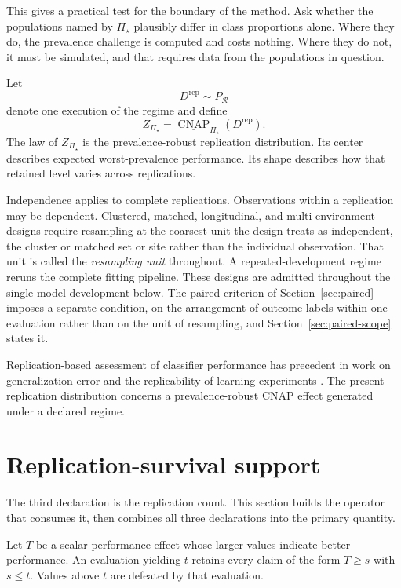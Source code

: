 \documentclass[11pt]{article}
\newcommand{\CNAP}{\operatorname{CNAP}}
\newcommand{\Regime}{\mathcal{R}}
\newcommand{\PSet}{\Pi_\star}
\newcommand{\RobCNAP}{\underline{\CNAP}_{\PSet}}
\theoremstyle{remark}
\begin{document}
This gives a practical test for the boundary of the method. Ask whether the populations named by $\PSet$ plausibly differ in class proportions alone. Where they do, the prevalence challenge is computed and costs nothing. Where they do not, it must be simulated, and that requires data from the populations in question.

Let
\[
D^{\mathrm{rep}}\sim P_{\Regime}
\]
denote one execution of the regime and define
\begin{equation}
Z_{\PSet}
=
\RobCNAP(D^{\mathrm{rep}}).
\label{eq:robust-replication-effect}
\end{equation}
The law of $Z_{\PSet}$ is the prevalence-robust replication distribution. Its center describes expected worst-prevalence performance. Its shape describes how that retained level varies across replications.

Independence applies to complete replications. Observations within a replication may be dependent. Clustered, matched, longitudinal, and multi-environment designs require resampling at the coarsest unit the design treats as independent, the cluster or matched set or site rather than the individual observation. That unit is called the \emph{resampling unit} throughout. A repeated-development regime reruns the complete fitting pipeline. These designs are admitted throughout the single-model development below. The paired criterion of Section~\ref{sec:paired} imposes a separate condition, on the arrangement of outcome labels within one evaluation rather than on the unit of resampling, and Section~\ref{sec:paired-scope} states it.

Replication-based assessment of classifier performance has precedent in work on generalization error and the replicability of learning experiments \cite{nadeau2003inference,bouckaert2004estimating}. The present replication distribution concerns a prevalence-robust CNAP effect generated under a declared regime.

\section{Replication-survival support}
\label{sec:support}

The third declaration is the replication count. This section builds the operator that consumes it, then combines all three declarations into the primary quantity.

Let $T$ be a scalar performance effect whose larger values indicate better performance. An evaluation yielding $t$ retains every claim of the form $T\geq s$ with $s\leq t$. Values above $t$ are defeated by that evaluation.
\end{document}
